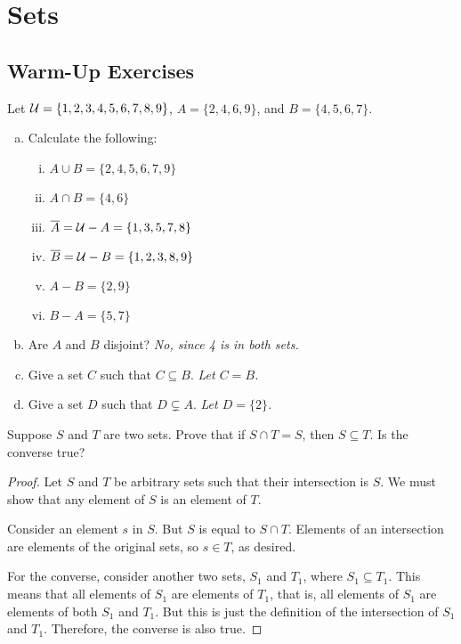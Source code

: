 \chapter{Sets}

\section{Warm-Up Exercises}

\begin{warmup}
  Let $\mathcal{U}=\{1,2,3,4,5,6,7,8,9\}$, $A=\{2,4,6,9\}$, and $B=\{4,5,6,7\}$.
\end{warmup}
\begin{enumerate}[(a)]
  \item Calculate the following:
        \begin{enumerate}[i.]
          \item $A \cup B = \{2,4,5,6,7,9\}$
          \item $A \cap B = \{4,6\}$
          \item $\overline{A} = \mathcal{U} - A = \{1,3,5,7,8\}$
          \item $\overline{B} = \mathcal{U} - B = \{1,2,3,8,9\}$
          \item $A-B = \{2,9\}$
          \item $B-A = \{5,7\}$
        \end{enumerate}
  \item Are $A$ and $B$ disjoint? \emph{No, since 4 is in both sets.}
  \item Give a set $C$ such that $C \subseteq B$. \emph{Let $C=B$.}
  \item Give a set $D$ such that $D \subsetneq A$. \emph{Let $D=\{2\}$.}
\end{enumerate}

\begin{warmup}
  Suppose $S$ and $T$ are two sets.
  Prove that if $S \cap T = S$, then $S \subseteq T$.
  Is the converse true?
\end{warmup}
\begin{proof}
  Let $S$ and $T$ be arbitrary sets such that their intersection is $S$.
  We must show that any element of $S$ is an element of $T$.

  Consider an element $s$ in $S$.
  But $S$ is equal to $S \cap T$.
  Elements of an intersection are elements of the original sets, so $s \in T$, as desired.

  For the converse, consider another two sets, $S_1$ and $T_1$, where $S_1 \subseteq T_1$.
  This means that all elements of $S_1$ are elements of $T_1$, that is, all elements of $S_1$ are elements of both $S_1$ and $T_1$.
  But this is just the definition of the intersection of $S_1$ and $T_1$.
  Therefore, the converse is also true.
\end{proof}


